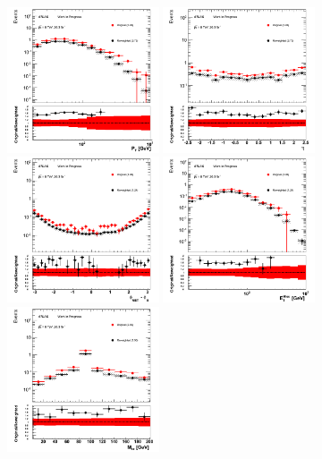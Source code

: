  \begin{figure}[htp]
 \centering
 \includegraphics[width=0.4\textwidth]{figures/ChargeMisID/Validation_ChargeMisIDRates_WZ_PTLepton.png}
 \includegraphics[width=0.4\textwidth]{figures/ChargeMisID/Validation_ChargeMisIDRates_WZ_EtaLepton.png}
 \includegraphics[width=0.4\textwidth]{figures/ChargeMisID/Validation_ChargeMisIDRates_WZ_DeltaPhi.png}
 \includegraphics[width=0.4\textwidth]{figures/ChargeMisID/Validation_ChargeMisIDRates_WZ_MET.png}
 \includegraphics[width=0.4\textwidth]{figures/ChargeMisID/Validation_ChargeMisIDRates_WZ_Mee.png}

\end{figure}
